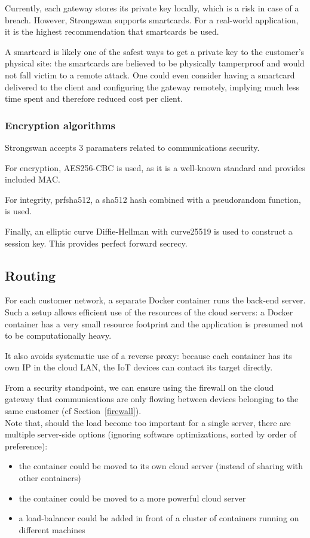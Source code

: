 \documentclass[paper=a4, fontsize=11pt]{scrartcl}
\begin{document}
Currently, each gateway stores its private key locally, which is a risk in case
of a breach.
However, Strongswan supports smartcards.
For a real-world application, it is the highest recommendation that smartcards
be used.

A smartcard is likely one of the safest ways to get a private key
to the customer's physical site: the smartcards are believed to be physically
tamperproof and would not fall victim to a remote attack.
One could even consider having a smartcard delivered to the client and
configuring the gateway remotely, implying much less time spent and therefore
reduced cost per client.

\subsubsection{Encryption algorithms}

Strongswan accepts 3 paramaters related to communications security.

For encryption, AES256-CBC is used, as it is a well-known standard and provides
included MAC\@.

For integrity, prfsha512, a sha512 hash combined with a pseudorandom
function, is used.

Finally, an elliptic curve Diffie-Hellman with curve25519 is used to
construct a session key.
This provides perfect forward secrecy.

\subsection{Routing}

For each customer network, a separate Docker container runs the back-end server.
Such a setup allows efficient use of the resources of the cloud servers: a
Docker container has a very small resource footprint and the application is
presumed not to be computationally heavy.

It also avoids systematic use of a reverse proxy: because each container has its
own IP in the cloud LAN, the IoT devices can contact its target directly.

From a security standpoint, we can ensure using the firewall on the cloud
gateway that communications are only flowing between devices belonging to
the same customer (cf Section~\ref{firewall}).
\\

Note that, should the load become too important for a single server, there are
multiple server-side options (ignoring software optimizations, sorted by order of
preference):
\begin{itemize}
    \item the container could be moved to its own cloud server (instead of
    sharing with other containers)
    \item the container could be moved to a more powerful cloud server
    \item a load-balancer could be added in front of a cluster of containers
        running on different machines
\end{itemize}
\end{document}
